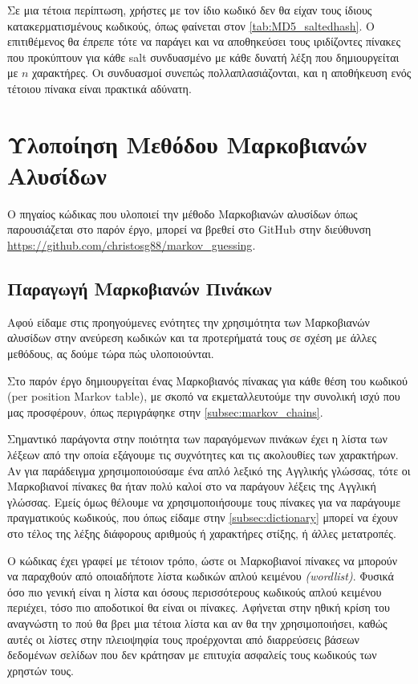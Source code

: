 \documentclass[11pt]{article}
\begin{document}
Σε μια τέτοια περίπτωση, χρήστες με τον ίδιο κωδικό δεν θα είχαν τους ίδιους κατακερματισμένους κωδικούς, όπως φαίνεται στον \autoref{tab:MD5_saltedhash}. Ο επιτιθέμενος θα έπρεπε τότε να παράγει και να αποθηκεύσει τους ιριδίζοντες πίνακες που προκύπτουν για κάθε salt συνδυασμένο με κάθε δυνατή λέξη που δημιουργείται με $n$ χαρακτήρες. Οι συνδυασμοί συνεπώς πολλαπλασιάζονται, και η αποθήκευση ενός τέτοιου πίνακα είναι πρακτικά αδύνατη.

\section{Υλοποίηση Μεθόδου Μαρκοβιανών Αλυσίδων}

Ο πηγαίος κώδικας που υλοποιεί την μέθοδο Μαρκοβιανών αλυσίδων όπως παρουσιάζεται στο παρόν έργο, μπορεί να βρεθεί στο GitHub στην διεύθυνση \url{https://github.com/christosg88/markov_guessing}.

\subsection{Παραγωγή Μαρκοβιανών Πινάκων}

Αφού είδαμε στις προηγούμενες ενότητες την χρησιμότητα των Μαρκοβιανών αλυσίδων στην ανεύρεση κωδικών και τα προτερήματά τους σε σχέση με άλλες μεθόδους, ας δούμε τώρα πώς υλοποιούνται.

Στο παρόν έργο δημιουργείται ένας Μαρκοβιανός πίνακας για κάθε θέση του κωδικού (per position Markov table), με σκοπό να εκμεταλλευτούμε την συνολική ισχύ που μας προσφέρουν, όπως περιγράφηκε στην \autoref{subsec:markov_chains}.

Σημαντικό παράγοντα στην ποιότητα των παραγόμενων πινάκων έχει η λίστα των λέξεων από την οποία εξάγουμε τις συχνότητες και τις ακολουθίες των χαρακτήρων. Αν για παράδειγμα χρησιμοποιούσαμε ένα απλό λεξικό της Αγγλικής γλώσσας, τότε οι Μαρκοβιανοί πίνακες θα ήταν πολύ καλοί στο να παράγουν λέξεις της Αγγλική γλώσσας. Εμείς όμως θέλουμε να χρησιμοποιήσουμε τους πίνακες για να παράγουμε πραγματικούς κωδικούς, που όπως είδαμε στην \autoref{subsec:dictionary} μπορεί να έχουν στο τέλος της λέξης διάφορους αριθμούς ή χαρακτήρες στίξης, ή άλλες μετατροπές.

Ο κώδικας έχει γραφεί με τέτοιον τρόπο, ώστε οι Μαρκοβιανοί πίνακες να μπορούν να παραχθούν από οποιαδήποτε λίστα κωδικών απλού κειμένου \textit{(wordlist)}. Φυσικά όσο πιο γενική είναι η λίστα και όσους περισσότερους κωδικούς απλού κειμένου περιέχει, τόσο πιο αποδοτικοί θα είναι οι πίνακες. Αφήνεται στην ηθική κρίση του αναγνώστη το πού θα βρει μια τέτοια λίστα και αν θα την χρησιμοποιήσει, καθώς αυτές οι λίστες στην πλειοψηφία τους προέρχονται από διαρρεύσεις βάσεων δεδομένων σελίδων που δεν κράτησαν με επιτυχία ασφαλείς τους κωδικούς των χρηστών τους.
\end{document}
